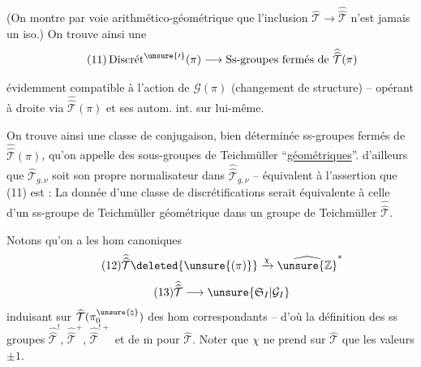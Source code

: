 

(On montre par voie arithmético-géométrique que l'inclusion
$\widehat{\mathcal{T}}\longrightarrow\widehat{\widehat{\mathcal{T}}}$
n'est jamais un iso.) On trouve ainsi une 
\[
\tag{11}
\operatorname{Discr\acute{e}t}^{\unsure{\prime}}(\pi)\longrightarrow
\text{Ss-groupes fermés de }\widehat{\widehat{\mathcal{T}}}(\pi)
\]
évidemment compatible à l'action de
$\widehat{\widehat{\mathcal{G}}}(\pi)$ (changement de structure) -- opérant
à droite via $\widehat{\widehat{\mathcal{T}}}(\pi)$ et ses autom. int. sur lui-même.

On trouve ainsi une classe de conjugaison, bien déterminée 
ss-groupes fermés de $\widehat{\widehat{\mathcal{T}}}(\pi)$,
qu'on appelle des sous-groupes de Teichmüller ``\uline{géométriques}''.
 d'ailleurs que $\widehat{\mathcal{T}}_{g,\nu}$ soit
son propre normalisateur dans $\widehat{\widehat{\mathcal{T}}}_{g,\nu}$
-- équivalent à l'assertion que (11) est  :
La donnée d'une classe de discrétifications
serait équivalente à celle d'un ss-groupe de Teichmüller géométrique dans
un groupe de Teichmüller  $\widehat{\widehat{\mathcal{T}}}$.




Notons qu'on a les hom canoniques
\[
\tag{12}
\widehat{\widehat{\mathcal{T}}}\deleted{\unsure{(\pi)}}
\xrightarrow{\chi}\widehat{\unsure{\mathbb{Z}}}^{*}
\]
\[
\tag{13}
\widehat{\widehat{\mathcal{T}}}\longrightarrow
\unsure{\mathfrak{S}_{I}|\mathcal{G}_{I}}
\]
induisant sur $\widehat{\mathcal{T}}(\pi_0^{\unsure{\natural}})$ des
 hom correspondants -- d'où la définition des
ss groupes $\widehat{\widehat{\mathcal{T}}}^{!}$,
$\widehat{\widehat{\mathcal{T}}}^{+}$,
$\widehat{\widehat{\mathcal{T}}}^{!+}$ et de $\overline{\mathrm m}$ pour
$\widehat{\mathcal{T}}$. Noter que $\chi$ ne prend sur $\widehat{\mathcal{T}}$
que les valeurs $\pm1$.

